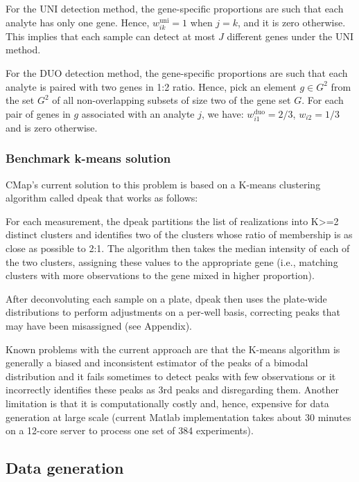 \documentclass[]{article}
\begin{document}
For the UNI detection method, the gene-specific proportions are such
that each analyte has only one gene. Hence, \(w^{\text{uni}}_{ik} = 1\)
when \(j = k\), and it is zero otherwise. This implies that each sample
can detect at most \(J\) different genes under the UNI method.

For the DUO detection method, the gene-specific proportions are such
that each analyte is paired with two genes in 1:2 ratio. Hence, pick an
element \(g\in G^2\) from the set \(G^2\) of all non-overlapping subsets
of size two of the gene set \(G\). For each pair of genes in \(g\)
associated with an analyte \(j\), we have:
\(w^{\text{duo}}_{i1} = 2/3\), \(w_{i2}=1/3\) and is zero otherwise.

\hypertarget{benchmark-k-means-solution}{%
\subsubsection{Benchmark k-means
solution}\label{benchmark-k-means-solution}}

CMap's current solution to this problem is based on a K-means clustering
algorithm called dpeak that works as follows:

For each measurement, the dpeak partitions the list of realizations into
K\textgreater=2 distinct clusters and identifies two of the clusters
whose ratio of membership is as close as possible to 2:1. The algorithm
then takes the median intensity of each of the two clusters, assigning
these values to the appropriate gene (i.e., matching clusters with more
observations to the gene mixed in higher proportion).

After deconvoluting each sample on a plate, dpeak then uses the
plate-wide distributions to perform adjustments on a per-well basis,
correcting peaks that may have been misassigned (see Appendix).

Known problems with the current approach are that the K-means algorithm
is generally a biased and inconsistent estimator of the peaks of a
bimodal distribution and it fails sometimes to detect peaks with few
observations or it incorrectly identifies these peaks as 3rd peaks and
disregarding them. Another limitation is that it is computationally
costly and, hence, expensive for data generation at large scale (current
Matlab implementation takes about 30 minutes on a 12-core server to
process one set of 384 experiments).

\hypertarget{data-generation}{%
\subsection{Data generation}\label{data-generation}}
\end{document}
